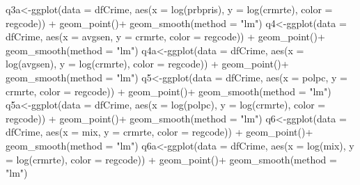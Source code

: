 \documentclass[]{article}
\newenvironment{Shaded}{}{}
\newcommand{\DataTypeTok}[1]{#1}
\newcommand{\KeywordTok}[1]{\textcolor[rgb]{0.00,0.00,1.00}{#1}}
\newcommand{\NormalTok}[1]{#1}
\newcommand{\OperatorTok}[1]{#1}
\newcommand{\StringTok}[1]{\textcolor[rgb]{0.00,0.50,0.50}{#1}}
\begin{document}
\begin{Shaded}
\begin{Highlighting}[]
\NormalTok{q3a<-}\KeywordTok{ggplot}\NormalTok{(}\DataTypeTok{data =}\NormalTok{ dfCrime, }\KeywordTok{aes}\NormalTok{(}\DataTypeTok{x =} \KeywordTok{log}\NormalTok{(prbpris), }\DataTypeTok{y =} \KeywordTok{log}\NormalTok{(crmrte), }\DataTypeTok{color =}\NormalTok{ regcode)) }\OperatorTok{+}\StringTok{ }
\StringTok{      }\KeywordTok{geom_point}\NormalTok{()}\OperatorTok{+}
\StringTok{  }\KeywordTok{geom_smooth}\NormalTok{(}\DataTypeTok{method =} \StringTok{"lm"}\NormalTok{)}
\NormalTok{q4<-}\KeywordTok{ggplot}\NormalTok{(}\DataTypeTok{data =}\NormalTok{ dfCrime, }\KeywordTok{aes}\NormalTok{(}\DataTypeTok{x =}\NormalTok{ avgsen, }\DataTypeTok{y =}\NormalTok{ crmrte, }\DataTypeTok{color =}\NormalTok{ regcode)) }\OperatorTok{+}\StringTok{ }
\StringTok{      }\KeywordTok{geom_point}\NormalTok{()}\OperatorTok{+}
\StringTok{  }\KeywordTok{geom_smooth}\NormalTok{(}\DataTypeTok{method =} \StringTok{"lm"}\NormalTok{)}
\NormalTok{q4a<-}\KeywordTok{ggplot}\NormalTok{(}\DataTypeTok{data =}\NormalTok{ dfCrime, }\KeywordTok{aes}\NormalTok{(}\DataTypeTok{x =} \KeywordTok{log}\NormalTok{(avgsen), }\DataTypeTok{y =} \KeywordTok{log}\NormalTok{(crmrte), }\DataTypeTok{color =}\NormalTok{ regcode)) }\OperatorTok{+}\StringTok{ }
\StringTok{      }\KeywordTok{geom_point}\NormalTok{()}\OperatorTok{+}
\StringTok{  }\KeywordTok{geom_smooth}\NormalTok{(}\DataTypeTok{method =} \StringTok{"lm"}\NormalTok{)}
\NormalTok{q5<-}\KeywordTok{ggplot}\NormalTok{(}\DataTypeTok{data =}\NormalTok{ dfCrime, }\KeywordTok{aes}\NormalTok{(}\DataTypeTok{x =}\NormalTok{ polpc, }\DataTypeTok{y =}\NormalTok{ crmrte, }\DataTypeTok{color =}\NormalTok{ regcode)) }\OperatorTok{+}\StringTok{ }
\StringTok{      }\KeywordTok{geom_point}\NormalTok{()}\OperatorTok{+}
\StringTok{  }\KeywordTok{geom_smooth}\NormalTok{(}\DataTypeTok{method =} \StringTok{"lm"}\NormalTok{)}
\NormalTok{q5a<-}\KeywordTok{ggplot}\NormalTok{(}\DataTypeTok{data =}\NormalTok{ dfCrime, }\KeywordTok{aes}\NormalTok{(}\DataTypeTok{x =} \KeywordTok{log}\NormalTok{(polpc), }\DataTypeTok{y =} \KeywordTok{log}\NormalTok{(crmrte), }\DataTypeTok{color =}\NormalTok{ regcode)) }\OperatorTok{+}\StringTok{ }
\StringTok{      }\KeywordTok{geom_point}\NormalTok{()}\OperatorTok{+}
\StringTok{  }\KeywordTok{geom_smooth}\NormalTok{(}\DataTypeTok{method =} \StringTok{"lm"}\NormalTok{)}
\NormalTok{q6<-}\KeywordTok{ggplot}\NormalTok{(}\DataTypeTok{data =}\NormalTok{ dfCrime, }\KeywordTok{aes}\NormalTok{(}\DataTypeTok{x =}\NormalTok{ mix, }\DataTypeTok{y =}\NormalTok{ crmrte, }\DataTypeTok{color =}\NormalTok{ regcode)) }\OperatorTok{+}\StringTok{ }
\StringTok{      }\KeywordTok{geom_point}\NormalTok{()}\OperatorTok{+}
\StringTok{  }\KeywordTok{geom_smooth}\NormalTok{(}\DataTypeTok{method =} \StringTok{"lm"}\NormalTok{)}
\NormalTok{q6a<-}\KeywordTok{ggplot}\NormalTok{(}\DataTypeTok{data =}\NormalTok{ dfCrime, }\KeywordTok{aes}\NormalTok{(}\DataTypeTok{x =} \KeywordTok{log}\NormalTok{(mix), }\DataTypeTok{y =} \KeywordTok{log}\NormalTok{(crmrte), }\DataTypeTok{color =}\NormalTok{ regcode)) }\OperatorTok{+}\StringTok{ }
\StringTok{      }\KeywordTok{geom_point}\NormalTok{()}\OperatorTok{+}
\StringTok{  }\KeywordTok{geom_smooth}\NormalTok{(}\DataTypeTok{method =} \StringTok{"lm"}\NormalTok{)}


\end{Highlighting}
\end{Shaded}
\end{document}

